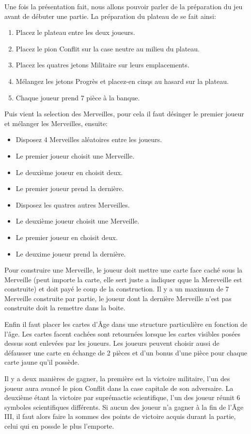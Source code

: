 \documentclass[a4paper, 12pt, french]{article}
\begin{document}
	Une fois la présentation fait, nous allons pouvoir parler de la préparation du jeu avant de débuter une partie.
	La préparation du plateau de se fait ainsi:
	\begin{enumerate}
		\item Placez le plateau entre les deux joueurs.
		\item Placez le pion Conflit sur la case neutre au milieu du plateau.
		\item Placez les quatres jetons Militaire sur leurs emplacements.
		\item Mélangez les jetons Progrès et placez-en cinqs au hasard sur la plateau.
		\item Chaque joueur prend 7 pièce à la banque.
	\end{enumerate}

	Puis vient la selection des Merveilles, pour cela il faut désinger le premier joueur et mélanger les Merveilles,
	ensuite:
	\begin{itemize}
		\item Disposez 4 Merveilles aléatoires entre les joueurs.
		\item Le premier joueur choisit une Merveille.
		\item Le deuxième joueur en choisit deux.
		\item Le premier joueur prend la dernière.
		\item Disposez les quatres autres Merveilles.
		\item Le deuxième joueur choisit une Merveille.
		\item Le premier joueur en choisit deux.
		\item Le deuxime joueur prend la dernière.
	\end{itemize}
	Pour construire une Merveille, le joueur doit mettre une carte face caché sous la Merveille (peut importe
	la carte, elle sert juste a indiquer qque la Mereveille est construite) et doit payé le coup de la construction.
	Il y a un maximum de 7 Merveille construite par partie, le joueur dont la dernière Merveille n'est pas construite
	doit la remettre dans la boite.

	Enfin il faut placer les cartes d'Âge dans une structure particulière en fonction de l'âge. Les cartes facent
	cachées sont retournées lorsque les cartes visibles posées dessus sont enlevées par les joueurs. Les joueurs
	peuvent choisir aussi de défausser une carte en échange de 2 pièces et d'un bonus d'une pièce pour chaque carte
	jaune qu'il possède.

	Il y a deux manières de gagner, la première est la victoire militaire, l'un des joueur aura avancé le pion
	Conflit dans la case capitale de son adversaire. La deuxième étant la victoire par suprémactie scientifique,
	l'un des joueur réunit 6 symboles scientifiques différents. Si aucun des joueur n'a gagner à la fin de l'Âge III,
	il faut alors faire la sommes des points de victoire acquis durant la partie, celui qui en possde le plus l'emporte.
\end{document}
